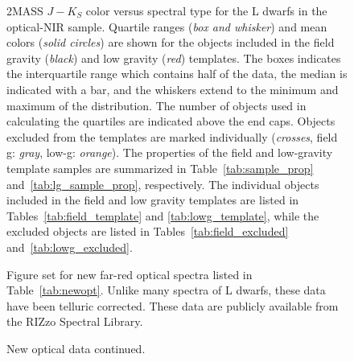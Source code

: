 \documentclass[12pt,preprint]{aastex}
\begin{document}
\begin{figure}
		\caption{2MASS $J-K_S$ color versus spectral type for the L dwarfs in the optical-NIR sample.
		Quartile ranges (\emph{box and whisker}) and mean colors (\emph{solid circles}) are shown for the objects included in the field gravity (\emph{black}) and low gravity (\emph{red}) templates. The boxes indicates the interquartile range which contains half of the data, the median is indicated with a bar, and the whiskers extend to the minimum and maximum of the distribution. The number of objects used in calculating the quartiles are indicated above the end caps.
		Objects excluded from the templates are marked individually (\emph{crosses}, field g: \emph{gray}, low-g: \emph{orange}).
		The properties of the field and low-gravity template samples are summarized in Table~\ref{tab:sample_prop} and~\ref{tab:lg_sample_prop}, respectively. The individual objects included in the field and low gravity templates are listed in Tables~\ref{tab:field_template} and \ref{tab:lowg_template}, while the excluded objects are listed in Tables~\ref{tab:field_excluded} and~\ref{tab:lowg_excluded}.}
	\label{fig:JK_colors}
\end{figure}

\begin{figure}
	\caption{Figure set for new far-red optical spectra listed in Table~\ref{tab:newopt}. Unlike many spectra of L dwarfs, these data have been telluric corrected. These data are publicly available from the RIZzo Spectral Library.}
		\label{fig:newopt}
\end{figure}

\begin{figure}
		\caption{New optical data continued.}
\end{figure}
\end{document}
